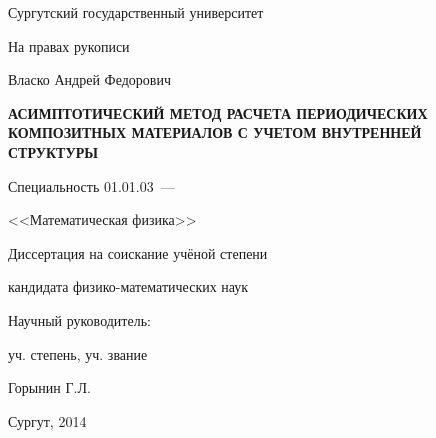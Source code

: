 \thispagestyle{empty}

\begin{center}
    Сургутский государственный университет
\par
\end{center}

\vspace{20mm} 
\begin{flushright}
На правах рукописи \\
\end{flushright}

\vspace{30mm}
\begin{center}
{\large Власко Андрей Федорович}
\end{center}

\vspace{5mm}
\begin{center}
{\bf \large АСИМПТОТИЧЕСКИЙ МЕТОД РАСЧЕТА ПЕРИОДИЧЕСКИХ КОМПОЗИТНЫХ МАТЕРИАЛОВ С УЧЕТОМ
    ВНУТРЕННЕЙ СТРУКТУРЫ
\par}

\vspace{10mm}
{%
Специальность 01.01.03~---

<<Математическая физика>>
}

\vspace{10mm}
Диссертация на соискание учёной степени

кандидата физико-математических наук
\end{center}

\vspace{20mm}
\begin{flushright}
Научный руководитель:

уч. степень, уч. звание

Горынин Г.Л.

\end{flushright}

\vspace{20mm}
\begin{center}
{Сургут, 2014}
\end{center}

\newpage
